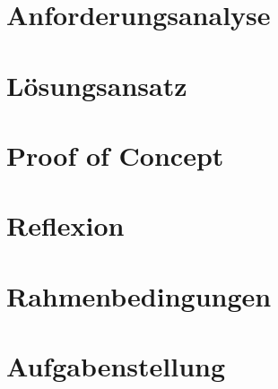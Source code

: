 \documentclass[
11pt, %
a4paper, %
BCOR10mm, %
DIV14, %
footsepline = false, %
headsepline, %
oneside, %
openright,
halfparskip, %
abstracton, %
listof=totocnumbered, %
bibliography=totocnumbered %
]{scrreprt}
\begin{document}
  \chapter{Anforderungsanalyse}\label{chap:anforderungen}
  
  
  \chapter{Lösungsansatz}\label{chap:loesungsansatz}
  
  
  \chapter{Proof of Concept}\label{chap:proof_of_concept}
  
  
  \chapter{Reflexion}\label{chap:reflexion}
  
  
  \appendix
  
  \chapter{Rahmenbedingungen}
  
  
  \chapter{Aufgabenstellung}\label{chap:aufgabenstellung}
  
  
  
  
  
  \listoffigures
  \listoftables
  
  
  
\end{document}
